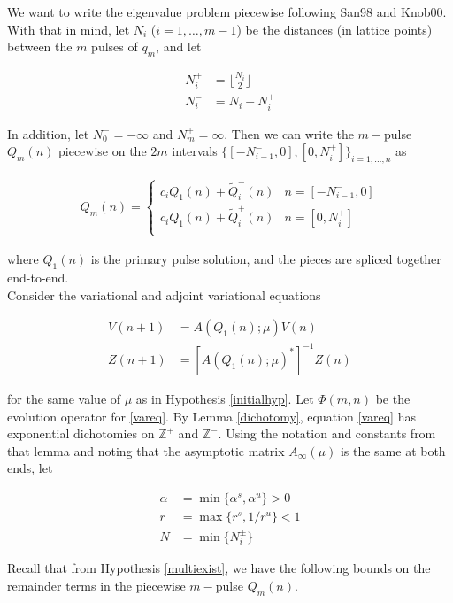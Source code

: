 \documentclass[12pt]{article}
\def\Z{{\mathbb Z}}
\begin{document}
We want to write the eigenvalue problem piecewise following San98 and Knob00. With that in mind, let $N_i$ ($i = 1, \dots, m-1$) be the distances (in lattice points) between the $m$ pulses of $q_m$, and let

\begin{align*}
N_i^+ &= \lfloor \frac{N_i}{2} \rfloor \\
N_i^- &= N_i - N_i^+
\end{align*}

In addition, let $N_0^- = -\infty$ and $N_m^+ = \infty$. Then we can write the $m-$pulse $Q_m(n)$ piecewise on the $2m$ intervals $\{ [-N_{i-1}^-, 0], [0, N_i^+] \}_{i=1, \dots, n}$ as

\begin{align}\label{qmpiecewise}
Q_m(n) =
\begin{cases}
c_i Q_1(n) + \tilde{Q}_i^-(n) & n = [-N_{i-1}^-, 0] \\
c_i Q_1(n) + \tilde{Q}_i^+(n) & n = [0, N_i^+] \\
\end{cases}
\end{align}

where $Q_1(n)$ is the primary pulse solution, and the pieces are spliced together end-to-end.\\

Consider the variational and adjoint variational equations

\begin{align}
V(n+1) &= A(Q_1(n); \mu) V(n) \label{vareq} \\
Z(n+1) &= [A(Q_1(n); \mu)^*]^{-1} Z(n) \label{adjvareq}
\end{align}

for the same value of $\mu$ as in Hypothesis \ref{initialhyp}. Let $\Phi(m, n)$ be the evolution operator for \eqref{vareq}. By Lemma \ref{dichotomy}, equation \eqref{vareq} has exponential dichotomies on $\Z^+$ and $\Z^-$. Using the notation and constants from that lemma and noting that the asymptotic matrix $A_\infty(\mu)$ is the same at both ends, let

\begin{align*}
\alpha &= \min \{ \alpha^s, \alpha^u \} > 0 \\
r &= \max \{ r^s, 1/r^u \} < 1 \\
N &= \min \{ N_i^\pm \}
\end{align*}

Recall that from Hypothesis \ref{multiexist}, we have the following bounds on the remainder terms in the piecewise $m-$pulse $Q_m(n)$.
\end{document}
